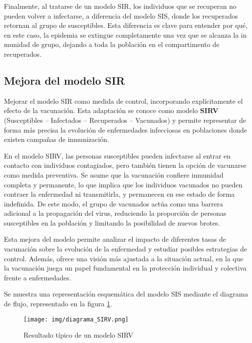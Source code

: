 Finalmente, al tratarse de un modelo SIR, los individuos que se recuperan no pueden volver a infectarse, a diferencia del modelo SIS, donde los recuperados retornan al grupo de susceptibles. Esta diferencia es clave para entender por qué, en este caso, la epidemia se extingue completamente una vez que se alcanza la in munidad de grupo, dejando a toda la población en el compartimento de recuperados.

\subsection{Mejora del modelo SIR}
Mejorar el modelo SIR como medida de control, incorporando explícitamente el efecto de la vacunación. Esta adaptación se conoce como modelo \textbf{SIRV} (Susceptibles – Infectados – Recuperados – Vacunados) y permite representar de forma más precisa la evolución de enfermedades infecciosas en poblaciones donde existen campañas de inmunización.

En el modelo SIRV, las personas susceptibles pueden infectarse al entrar en contacto con individuos contagiados, pero también tienen la opción de vacunarse como medida preventiva. Se asume que la vacunación confiere inmunidad completa y permanente, lo que implica que los individuos vacunados no pueden contraer la enfermedad ni transmitirla, y permanecen en ese estado de forma indefinida. De este modo, el grupo de vacunados actúa como una barrera adicional a la propagación del virus, reduciendo la proporción de personas susceptibles en la población y limitando la posibilidad de nuevos brotes.

Esta mejora del modelo permite analizar el impacto de diferentes tasas de vacunación sobre la evolución de la enfermedad y estudiar posibles estrategias de control. Además, ofrece una visión más ajustada a la situación actual, en la que la vacunación juega un papel fundamental en la protección individual y colectiva frente a enfermedades.

Se muestra una representación esquemática del modelo SIS mediante el diagrama de flujo, representado en la figura \ref{fig:ejemplo SIRV}.

\begin{figure}[H]
    \centering
    \texttt{[image: img/diagrama\_SIRV.png]}
    \caption{Resultado típico de un modelo SIRV}
    \label{fig:ejemplo SIRV}
    \vspace{0.5cm} %
\end{figure}

